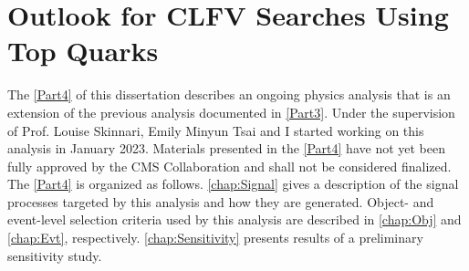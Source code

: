 \part{Outlook for CLFV Searches Using Top Quarks}
\label{Part4}
The \autoref{Part4} of this dissertation describes an ongoing physics analysis that is an extension of the previous analysis documented in \autoref{Part3}. Under the supervision of Prof. Louise Skinnari, Emily Minyun Tsai and I started working on this analysis in January 2023. Materials presented in the \autoref{Part4} have not yet been fully approved by the \ac{CMS} Collaboration and shall not be considered finalized. The \autoref{Part4} is organized as follows. \autoref{chap:Signal} gives a description of the signal processes targeted by this analysis and how they are generated. Object- and event-level selection criteria used by this analysis are described in \autoref{chap:Obj} and \autoref{chap:Evt}, respectively. \autoref{chap:Sensitivity} presents results of a preliminary sensitivity study.




